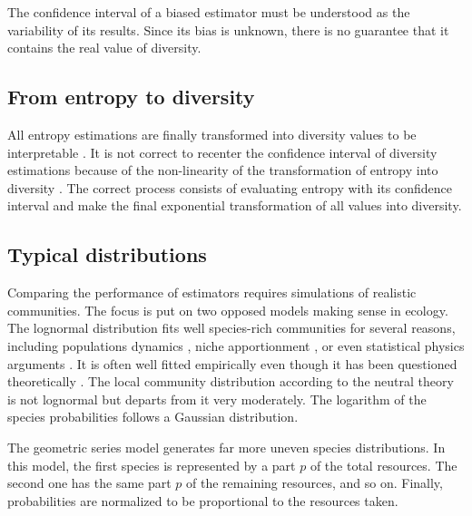 \documentclass[fleqn,10pt]{latex/stylish_article} %
\begin{document}
The confidence interval of a biased estimator must be understood as the variability of its results.
Since its bias is unknown, there is no guarantee that it contains the real value of diversity.

\hypertarget{from-entropy-to-diversity}{%
\subsection{From entropy to diversity}\label{from-entropy-to-diversity}}

All entropy estimations are finally transformed into diversity values to be interpretable \citep{Jost2006}.
It is not correct to recenter the confidence interval of diversity estimations because of the non-linearity of the transformation of entropy into diversity \citep{Marcon2012a}.
The correct process consists of evaluating entropy with its confidence interval and make the final exponential transformation of all values into diversity.

\hypertarget{typical-distributions}{%
\subsection{Typical distributions}\label{typical-distributions}}

\scriptsize

\normalsize

\scriptsize

\normalsize

Comparing the performance of estimators requires simulations of realistic communities.
The focus is put on two opposed models making sense in ecology.
The lognormal distribution \citep{Preston1948} fits well species-rich communities for several reasons, including populations dynamics \citep{Engen1996}, niche apportionment \citep{Bulmer1974}, or even statistical physics arguments \citep{Pueyo2007, Dewar2008}.
It is often well fitted empirically \citep{Tokeshi1990} even though it has been questioned theoretically \citep{Williamson2005}.
The local community distribution according to the neutral theory \citep{Volkov2003} is not lognormal but departs from it very moderately.
The logarithm of the species probabilities follows a Gaussian distribution.

The geometric series model \citep{Motomura1932, Whittaker1972} generates far more uneven species distributions.
In this model, the first species is represented by a part \(p\) of the total resources.
The second one has the same part \(p\) of the remaining resources, and so on.
Finally, probabilities are normalized to be proportional to the resources taken.
\end{document}
